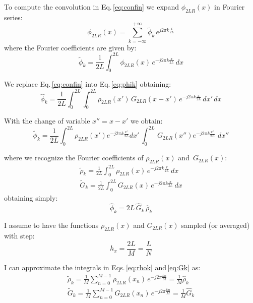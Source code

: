To compute the convolution in Eq.\,\ref{eq:confin} we expand $\phi_{2LR}(x)$ in Fourier series:
\begin{equation}
\phi_{2LR}(x) = \sum_{k=-\infty}^{+\infty} \tilde{\phi}_k\, e^{j2\pi k \frac{x}{2L}}
\label{eq:phifour}
\end{equation}
where the Fourier coefficients are given by:
\begin{equation}
\tilde{\phi}_k = \frac{1}{2L}\int_0^{2L} \phi_{2LR}(x)\, e^{-j2\pi k \frac{x}{2L}} \, dx
\label{eq:phik}
\end{equation}

We replace Eq.\,\eqref{eq:confin} into Eq.\,\eqref{eq:phik} obtaining:
\begin{equation}
\hat{\phi}_k = \frac{1}{2L}\int_0^{2L} \int_{0 }^{2L} 
\rho_{2LR}(x')\,G_{2LR}(x-x') \, e^{-j2\pi k \frac{x}{2L}} \,  dx'\, dx
\end{equation}

With the change of variable $x'' = x-x'$ we obtain:
\begin{equation}
\tilde{\phi}_k = 
\frac{1}{2L}
\int_0^{2L} 
\rho_{2LR}(x') e^{-j2\pi k \frac{x'}{2L}}dx'\,
\int_{0 }^{2L} 
\,G_{2LR}(x'') e^{-j2\pi k \frac{x''}{2L}}\,  \,  dx''
\end{equation}

where we recognize the Fourier coefficients of $\rho_{2LR}(x)$ and $\,G_{2LR}(x)$:
\begin{align}
\tilde{\rho}_k = \frac{1}{2L}\int_0^{2L} \rho_{2LR}(x)\, e^{-j2\pi k \frac{x}{2L}} \, dx \label{eq:rhok}\\
\tilde{G}_k = \frac{1}{2L}\int_0^{2L} G_{2LR}(x)\, e^{-j2\pi k \frac{x}{2L}} \, dx \label{eq:Gk}
\end{align}
obtaining simply:
\begin{equation}
\hat{\phi}_k = 2L \, \hat{G}_k \, \hat{\rho}_k
\label{eq:freqconv}
\end{equation}

I assume to have the functions $\rho_{2LR}(x)$ and  $G_{2LR}(x)$ sampled (or averaged) with step:
\begin{equation}
h_x = \frac{2L}{M} = \frac{L}{N}
\end{equation}

I can approximate the integrals in Eqs.\,\eqref{eq:rhok} and\,\eqref{eq:Gk} as:
\begin{align}
\tilde{\rho}_k = \frac{1}{M}\sum_{n=0}^{M-1} \rho_{2LR}(x_n)\, e^{-j2\pi  \frac{kn}{M}}  
= \frac{1}{M} \hat{\rho}_k
\label{eq:rhokfft}\\
\tilde{G}_k = \frac{1}{M}\sum_{n=0}^{M-1} G_{2LR}(x_n)\, e^{-j2\pi  \frac{kn}{M}} 
= \frac{1}{M} \hat{G}_k\label{eq:Gkfft}
\end{align}

